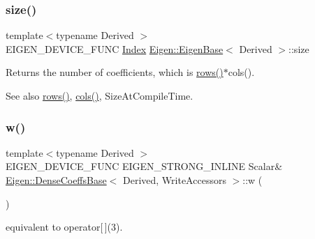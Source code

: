 \subsubsection{\texorpdfstring{size()}{size()}}
{\footnotesize\ttfamily template$<$typename Derived $>$ \\
E\+I\+G\+E\+N\+\_\+\+D\+E\+V\+I\+C\+E\+\_\+\+F\+U\+NC \mbox{\hyperlink{struct_eigen_1_1_eigen_base_a554f30542cc2316add4b1ea0a492ff02}{Index}} \mbox{\hyperlink{struct_eigen_1_1_eigen_base}{Eigen\+::\+Eigen\+Base}}$<$ Derived $>$\+::size\hspace{0.3cm}{\ttfamily [inline]}}

\begin{DoxyReturn}{Returns}
the number of coefficients, which is \mbox{\hyperlink{struct_eigen_1_1_eigen_base_a8141320ba8df384426c298b32b000d8e}{rows()}}$\ast$cols(). 
\end{DoxyReturn}
\begin{DoxySeeAlso}{See also}
\mbox{\hyperlink{struct_eigen_1_1_eigen_base_a8141320ba8df384426c298b32b000d8e}{rows()}}, \mbox{\hyperlink{struct_eigen_1_1_eigen_base_a7b0b45c7351847696c911ce8aa2abbdb}{cols()}}, Size\+At\+Compile\+Time. 
\end{DoxySeeAlso}
\mbox{\label{class_eigen_1_1_dense_coeffs_base_3_01_derived_00_01_write_accessors_01_4_a225a129a5f2d8863068bd5629a6144a6}} 
\subsubsection{\texorpdfstring{w()}{w()}}
{\footnotesize\ttfamily template$<$typename Derived $>$ \\
E\+I\+G\+E\+N\+\_\+\+D\+E\+V\+I\+C\+E\+\_\+\+F\+U\+NC E\+I\+G\+E\+N\+\_\+\+S\+T\+R\+O\+N\+G\+\_\+\+I\+N\+L\+I\+NE Scalar\& \mbox{\hyperlink{class_eigen_1_1_dense_coeffs_base}{Eigen\+::\+Dense\+Coeffs\+Base}}$<$ Derived, Write\+Accessors $>$\+::w (\begin{DoxyParamCaption}{ }\end{DoxyParamCaption})\hspace{0.3cm}{\ttfamily [inline]}}

equivalent to operator\mbox{[}$\,$\mbox{]}(3). \mbox{\label{class_eigen_1_1_dense_coeffs_base_3_01_derived_00_01_write_accessors_01_4_a2a9ca10b9ee750cefc5f914f215cba18}} 

